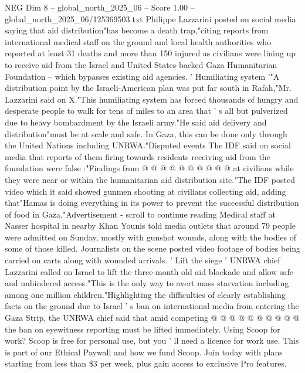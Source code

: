 \begin{textsample}{NEG Dim 8 – global\_north\_2025\_06 – Score 1.00 – global\_north\_2025\_06/125369503.txt}  \label{ex:f8_neg_402}
Philippe Lazzarini posted on social media saying that aid distribution"has become a death trap,"citing reports from international medical staff on the ground and local health authorities who reported at least 31 deaths and more than 150 injured as civilians were lining up to receive aid from the Israel and United States-backed Gaza Humanitarian Foundation -- which bypasses existing aid agencies. ' Humiliating system '"A distribution point by the Israeli-American plan was put far south in Rafah,"Mr.
Lazzarini said on X."This humiliating system has forced thousands of hungry and desperate people to walk for tens of miles to an area that ' s all but pulverized due to heavy bombardment by the Israeli army."He said aid delivery and distribution"must be at scale and safe.
In Gaza, this can be done only through the United Nations including UNRWA."Disputed events The IDF said on social media that reports of them firing towards residents receiving aid from the foundation were false :"Findings from @ @ @ @ @ @ @ @ @ @ at civilians while they were near or within the humanitarian aid distribution site."The IDF posted video which it said showed gunmen shooting at civilians collecting aid, adding that"Hamas is doing everything in its power to prevent the successful distribution of food in Gaza."Advertisement - scroll to continue reading Medical staff at Nasser hospital in nearby Khan Younis told media outlets that around 79 people were admitted on Sunday, mostly with gunshot wounds, along with the bodies of some of those killed.
Journalists on the scene posted video footage of bodies being carried on carts along with wounded arrivals. ' Lift the siege ' UNRWA chief Lazzarini called on Israel to lift the three-month old aid blockade and allow safe and unhindered access."This is the only way to avert mass starvation including among one million children."Highlighting the difficulties of clearly establishing facts on the ground due to Israel ' s ban on international media from entering the Gaza Strip, the UNRWA chief said that amid competing @ @ @ @ @ @ @ @ @ @ the ban on eyewitness reporting must be lifted immediately.
Using Scoop for work?
Scoop is free for personal use, but you ' ll need a licence for work use.
This is part of our Ethical Paywall and how we fund Scoop.
Join today with plans starting from less than \$3 per week, plus gain access to exclusive Pro features.

\end{textsample}
